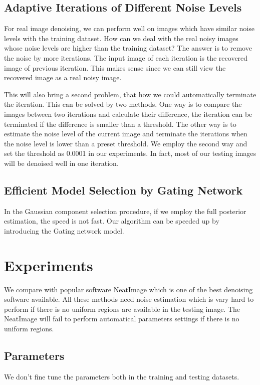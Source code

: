 \documentclass[10pt,twocolumn,letterpaper]{article}
\begin{document}
\subsection{Adaptive Iterations of Different Noise Levels}
For real image denoising, we can perform well on images which have similar noise levels with the training dataset. How can we deal with the real noisy images whose noise levels are higher than the training dataset? The answer is to remove the noise by more iterations. The input image of each iteration is the recovered image of previous iteration. This makes sense since we can still view the recovered image as a real noisy image. 

This will also bring a second problem, that how we could automatically terminate the iteration. This can be solved by two methods. One way is to compare the images between two iterations and calculate their difference, the iteration can be terminated if the difference is smaller than a threshold. The other way is to estimate the noise level of the current image and terminate the iterations when the noise level is lower than a preset threshold. We employ the second way and set the threshold as 0.0001 in our experiments. In fact, most of our testing images will be denoised well in one iteration.

\subsection{Efficient Model Selection by Gating Network}
In the Gaussian component selection procedure, if we employ the full posterior estimation, the speed is not fast. Our algorithm can be speeded up by introducing the Gating network model.

\section{Experiments}

We compare with popular software NeatImage which is one of the best denoising software available. All these methods need noise estimation which is vary hard to perform if there is no uniform regions are available in the testing image. The NeatImage will fail to perform automatical parameters settings if there is no uniform regions.

\subsection{Parameters}
We don't fine tune the parameters both in the training and testing datasets.
\end{document}
